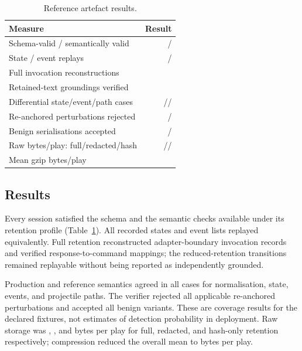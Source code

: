 \documentclass[conference,a4paper]{IEEEtran}
\begin{document}
\begin{table}[t]
\caption{Reference artefact results.}
\label{tab:results}
\centering
\small
\begin{tabular}{@{}lr@{}}
\toprule
Measure & Result \\
\midrule
Schema-valid / semantically valid & \ResultSchemaValid{} / \ResultValidSessions{} \\
State / event replays & \ResultStateEquivalent{} / \ResultEventEquivalent{} \\
Full invocation reconstructions & \ResultExactRequests{} \\
Retained-text groundings verified & \ResultVerifiedGroundings{} \\
Differential state/event/path cases & \ResultDifferentialState{}/\ResultDifferentialEvents{}/\ResultDifferentialPaths{} \\
Re-anchored perturbations rejected & \ResultFaultsDetected{}/\ResultFaults{} \\
Benign serialisations accepted & \ResultSerializationAccepted{}/\ResultSerializationVariants{} \\
Raw bytes/play: full/redacted/hash & \ResultRawBytesFull{}/\ResultRawBytesRedacted{}/\ResultRawBytesHashed{} \\
Mean gzip bytes/play & \ResultGzipBytes{} \\
\bottomrule
\end{tabular}
\end{table}

\subsection{Results}
Every session satisfied the schema and the semantic checks available under its retention profile (Table~\ref{tab:results}). All \ResultPlays{} recorded states and event lists replayed equivalently. Full retention reconstructed \ResultExactRequests{} adapter-boundary invocation records and verified \ResultVerifiedGroundings{} response-to-command mappings; the \ResultCommittedGroundings{} reduced-retention transitions remained replayable without being reported as independently grounded.

Production and reference semantics agreed in all \ResultDifferentialCases{} cases for normalisation, state, events, and projectile paths. The verifier rejected all \ResultFaults{} applicable re-anchored perturbations and accepted all \ResultSerializationVariants{} benign variants. These are coverage results for the declared fixtures, not estimates of detection probability in deployment. Raw storage was \ResultRawBytesFull{}, \ResultRawBytesRedacted{}, and \ResultRawBytesHashed{} bytes per play for full, redacted, and hash-only retention respectively; compression reduced the overall mean to \ResultGzipBytes{} bytes per play.
\end{document}
